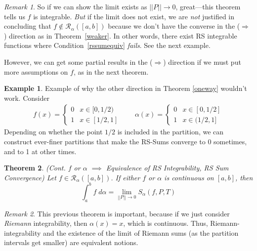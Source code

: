 \documentclass[12pt]{article}
\numberwithin{equation}{section} %
\theoremstyle{plain}
\newtheorem{thm}{Theorem}[section]
\theoremstyle{definition}
\newtheorem{ex}[thm]{Example}
\theoremstyle{remark}
\newtheorem*{rmk}{Remark}
\newcommand{\sR}{\mathscr{R}}
\begin{document}
\begin{rmk}
So if we can show the limit exists as $||P||\rightarrow 0$, great---this
theorem tells us $f$ is integrable.
\emph{But} if the limit does not exist, we are \emph{not} justified in
concluding that $f\not\in\sR_\alpha([a,b])$ because we don't have the
converse in the ($\Rightarrow$) direction as in Theorem~\ref{weaker}.
In other words, there exist RS integrable functions where
Condition~\ref{rssumequiv} \emph{fails}. See the next example.

However, we can get some partial results in the ($\Rightarrow$)
direction if we must put more assumptions on $f$, as in the next
theorem.
\end{rmk}

\begin{ex}
Example of why the other direction in Theorem \ref{oneway} wouldn't
work. Consider
\begin{align*}
  f(x) = \begin{cases} 0 & x \in [0, 1/2) \\ 1 & x \in [1/2, 1]
        \end{cases}  \qquad
    \alpha(x) = \begin{cases} 0 & x \in [0,1/2] \\ 1& x\in(1/2, 1]
        \end{cases}
\end{align*}
Depending on whether the point $1/2$ is included in the partition, we
can construct ever-finer partitions that make the RS-Sums converge to 0
sometimes, and to 1 at other times.
\end{ex}

\begin{thm}
\emph{(Cont. $f$ or $\alpha$ $\implies$ Equivalence of RS Integrability,
RS Sum Convergence)}
Let $f\in\mathscr{R}_\alpha([a,b])$. If either $f$ or $\alpha$ is
continuous on $[a,b]$, then
\begin{equation}
    \label{limsum.toprove}
    \int^b_a f\;d\alpha = \lim_{||P||\rightarrow 0}
    S_\alpha(f,P,T)
\end{equation}
\end{thm}
\begin{rmk}
This previous theorem is important, because if we just consider \emph{Riemann} integrability, then $\alpha(x) = x$, which is continuous. Thus, Riemann-integrability and the existence of the limit of Riemann sums (as the partition intervals get smaller) are equivalent notions.
\end{rmk}
\end{document}
